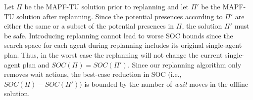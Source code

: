 \documentclass[jair,twoside,11pt,theapa]{article}
\newcommand{\mapftu}{MAPF-TU\xspace}
\begin{document}
Let $\Pi$ be the \mapftu solution prior to replanning and let $\Pi'$ be the \mapftu solution after replanning. 
Since the potential presences according to $\Pi'$ are either the same or a subset of the potential presences in $\Pi$, 
the solution $\Pi'$ must be safe. 
Introducing replanning cannot lead to worse SOC bounds since the search space for each agent during replanning includes its original single-agent plan.
Thus, in the worst case the replanning will not change the current single-agent plan and $SOC(\Pi)=SOC(\Pi')$. %
Since our replanning algorithm only removes wait actions, the best-case reduction in SOC (i.e., $SOC(\Pi)-SOC(\Pi')$) 
is bounded by the number of \emph{wait} moves in the offline solution.

\end{document}
